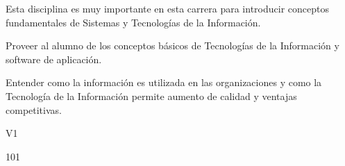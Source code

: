 \begin{syllabus}


\begin{justification}
Esta disciplina es muy importante en esta carrera para introducir conceptos fundamentales de Sistemas y Tecnologías de la Información.
\end{justification}

\begin{goals}
\item Proveer al alumno de los conceptos básicos de Tecnologías de la Información y software de aplicación.
\item Entender como la información es utilizada en las organizaciones y como la Tecnología de la Información permite aumento de calidad y ventajas competitivas.
\end{goals}

\begin{outcomes}{V1}
   \item {}
   \item {}
   \item {}
   \item {}
   \item {}
   \item {}
   \item {}
   \item {}
\end{outcomes}

\begin{unit}{\LUFIVEDef}{}{\LUFIVEBib}{10}{1}
   \begin{topics}
      \item \OMCTWOTopicTWOxTWOxONEOH
      \item \TDSONETopicTHREExONExONE
      \item \TDSONETopicTHREExONExTWO
      \item \TDSONETopicTHREExONExTHREE
      \item \TDSONETopicTHREExONExFOUR
      \item \TDSONETopicTHREExONExFIVE
   \end{topics}
	\LUFIVEGoal
\end{unit}

\begin{coursebibliography}
\end{coursebibliography}

\end{syllabus}
